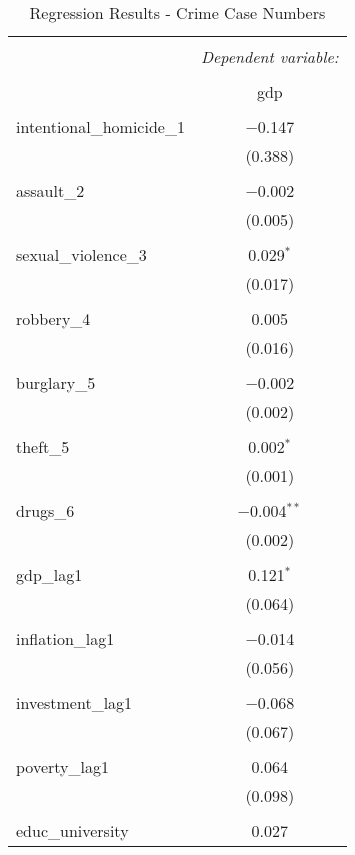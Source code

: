 
\begin{table}[!htbp] \centering 
  \caption{Regression Results - Crime Case Numbers} 
  \label{} 
\begin{tabular}{@{\extracolsep{5pt}}lc} 
\\[-1.8ex]\hline 
\hline \\[-1.8ex] 
 & \multicolumn{1}{c}{\textit{Dependent variable:}} \\ 
\cline{2-2} 
\\[-1.8ex] & gdp \\ 
\hline \\[-1.8ex] 
 intentional\_homicide\_1 & $-$0.147 \\ 
  & (0.388) \\ 
  & \\ 
 assault\_2 & $-$0.002 \\ 
  & (0.005) \\ 
  & \\ 
 sexual\_violence\_3 & 0.029$^{*}$ \\ 
  & (0.017) \\ 
  & \\ 
 robbery\_4 & 0.005 \\ 
  & (0.016) \\ 
  & \\ 
 burglary\_5 & $-$0.002 \\ 
  & (0.002) \\ 
  & \\ 
 theft\_5 & 0.002$^{*}$ \\ 
  & (0.001) \\ 
  & \\ 
 drugs\_6 & $-$0.004$^{**}$ \\ 
  & (0.002) \\ 
  & \\ 
 gdp\_lag1 & 0.121$^{*}$ \\ 
  & (0.064) \\ 
  & \\ 
 inflation\_lag1 & $-$0.014 \\ 
  & (0.056) \\ 
  & \\ 
 investment\_lag1 & $-$0.068 \\ 
  & (0.067) \\ 
  & \\ 
 poverty\_lag1 & 0.064 \\ 
  & (0.098) \\ 
  & \\ 
 educ\_university & 0.027 \\ 

\end{tabular}
\end{table}
